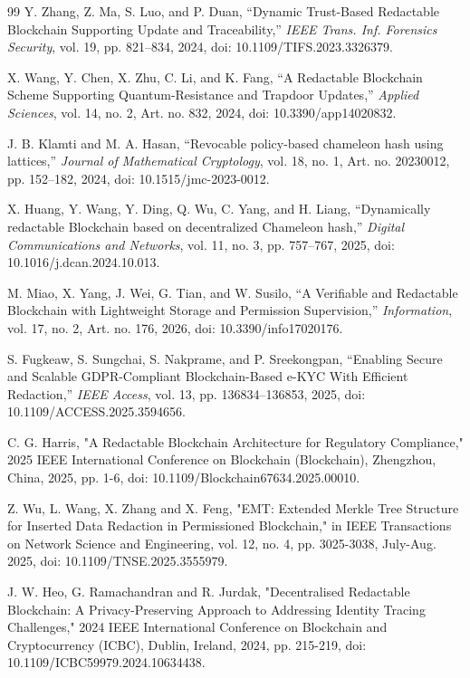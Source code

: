 \documentclass[lettersize,journal]{IEEEtran}
\begin{document}
\begin{thebibliography}{99}
    Y. Zhang, Z. Ma, S. Luo, and P. Duan,
    ``Dynamic Trust-Based Redactable Blockchain Supporting Update and Traceability,''
    \textit{IEEE Trans. Inf. Forensics Security}, vol. 19, pp. 821--834, 2024,
    doi: 10.1109/TIFS.2023.3326379.
    
    X. Wang, Y. Chen, X. Zhu, C. Li, and K. Fang,
    ``A Redactable Blockchain Scheme Supporting Quantum-Resistance and Trapdoor Updates,''
    \textit{Applied Sciences}, vol. 14, no. 2, Art. no. 832, 2024,
    doi: 10.3390/app14020832.
    
    J. B. Klamti and M. A. Hasan,
    ``Revocable policy-based chameleon hash using lattices,''
    \textit{Journal of Mathematical Cryptology}, vol. 18, no. 1, Art. no. 20230012,
    pp. 152--182, 2024,
    doi: 10.1515/jmc-2023-0012.
    
    X. Huang, Y. Wang, Y. Ding, Q. Wu, C. Yang, and H. Liang,
    ``Dynamically redactable Blockchain based on decentralized Chameleon hash,''
    \textit{Digital Communications and Networks}, vol. 11, no. 3, pp. 757--767, 2025,
    doi: 10.1016/j.dcan.2024.10.013.
    
    M. Miao, X. Yang, J. Wei, G. Tian, and W. Susilo,
    ``A Verifiable and Redactable Blockchain with Lightweight Storage and Permission Supervision,''
    \textit{Information}, vol. 17, no. 2, Art. no. 176, 2026,
    doi: 10.3390/info17020176.
    
    S. Fugkeaw, S. Sungchai, S. Nakprame, and P. Sreekongpan,
    ``Enabling Secure and Scalable GDPR-Compliant Blockchain-Based e-KYC With Efficient Redaction,''
    \textit{IEEE Access}, vol. 13, pp. 136834--136853, 2025,
    doi: 10.1109/ACCESS.2025.3594656.
    
    
    C. G. Harris, "A Redactable Blockchain Architecture for Regulatory Compliance," 2025 IEEE International Conference on Blockchain (Blockchain), Zhengzhou, China, 2025, pp. 1-6, doi: 10.1109/Blockchain67634.2025.00010.
    
    Z. Wu, L. Wang, X. Zhang and X. Feng, "EMT: Extended Merkle Tree Structure for Inserted Data Redaction in Permissioned Blockchain," in IEEE Transactions on Network Science and Engineering, vol. 12, no. 4, pp. 3025-3038, July-Aug. 2025, doi: 10.1109/TNSE.2025.3555979.
    
    J. W. Heo, G. Ramachandran and R. Jurdak, "Decentralised Redactable Blockchain: A Privacy-Preserving Approach to Addressing Identity Tracing Challenges," 2024 IEEE International Conference on Blockchain and Cryptocurrency (ICBC), Dublin, Ireland, 2024, pp. 215-219, doi: 10.1109/ICBC59979.2024.10634438.
    

\end{thebibliography}
\end{document}
